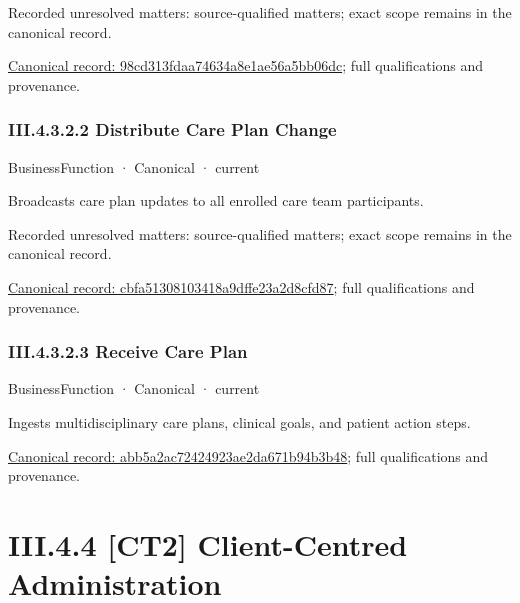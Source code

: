 {\small Recorded unresolved matters: source-qualified matters; exact scope remains in the canonical record.}\par
{\footnotesize \href{../../../../continuum/business/business-function/98cd313fdaa74634a8e1ae56a5bb06dc.md}{Canonical record: 98cd313fdaa74634a8e1ae56a5bb06dc}; full qualifications and provenance.}\par
\subsubsection*{III.4.3.2.2 Distribute Care Plan Change}
\label{navigation:III.4.3.2.2}

\label{element:cbfa51308103418a9dffe23a2d8cfd87}
{\small BusinessFunction · Canonical · current}\par

Broadcasts care plan updates to all enrolled care team participants.


{\small Recorded unresolved matters: source-qualified matters; exact scope remains in the canonical record.}\par
{\footnotesize \href{../../../../continuum/business/business-function/cbfa51308103418a9dffe23a2d8cfd87.md}{Canonical record: cbfa51308103418a9dffe23a2d8cfd87}; full qualifications and provenance.}\par
\subsubsection*{III.4.3.2.3 Receive Care Plan}
\label{navigation:III.4.3.2.3}

\label{element:abb5a2ac72424923ae2da671b94b3b48}
{\small BusinessFunction · Canonical · current}\par

Ingests multidisciplinary care plans, clinical goals, and patient action steps.


{\footnotesize \href{../../../../continuum/business/business-function/abb5a2ac72424923ae2da671b94b3b48.md}{Canonical record: abb5a2ac72424923ae2da671b94b3b48}; full qualifications and provenance.}\par
\section*{III.4.4 [CT2] Client-Centred Administration}
\label{navigation:III.4.4}

